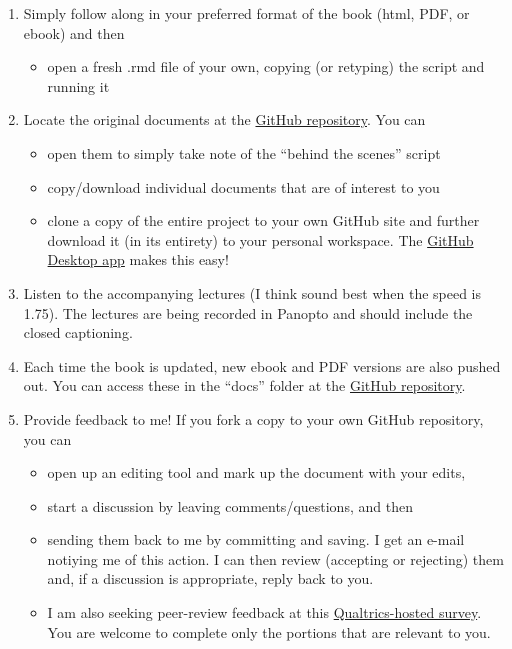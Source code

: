 \documentclass[
  11pt,
]{book}
\providecommand{\tightlist}{%
  \setlength{\itemsep}{0pt}\setlength{\parskip}{0pt}}
\begin{document}
\begin{enumerate}
\def\labelenumi{\arabic{enumi}.}
\item
  Simply follow along in your preferred format of the book (html, PDF, or ebook) and then

  \begin{itemize}
  \tightlist
  \item
    open a fresh .rmd file of your own, copying (or retyping) the script and running it
  \end{itemize}
\item
  Locate the original documents at the \href{https://github.com/lhbikos/ReCenterPsychStats}{GitHub repository}. You can

  \begin{itemize}
  \tightlist
  \item
    open them to simply take note of the ``behind the scenes'' script
  \item
    copy/download individual documents that are of interest to you
  \item
    clone a copy of the entire project to your own GitHub site and further download it (in its entirety) to your personal workspace. The \href{https://desktop.github.com/}{GitHub Desktop app} makes this easy!
  \end{itemize}
\item
  Listen to the accompanying lectures (I think sound best when the speed is 1.75). The lectures are being recorded in Panopto and should include the closed captioning.
\item
  Each time the book is updated, new ebook and PDF versions are also pushed out. You can access these in the ``docs'' folder at the \href{https://github.com/lhbikos/ReCenterPsychStats}{GitHub repository}.
\item
  Provide feedback to me! If you fork a copy to your own GitHub repository, you can

  \begin{itemize}
  \tightlist
  \item
    open up an editing tool and mark up the document with your edits,
  \item
    start a discussion by leaving comments/questions, and then
  \item
    sending them back to me by committing and saving. I get an e-mail notiying me of this action. I can then review (accepting or rejecting) them and, if a discussion is appropriate, reply back to you.
  \item
    I am also seeking peer-review feedback at this \href{https://spupsych.az1.qualtrics.com/jfe/form/SV_0OnBLfut3VIOIS2}{Qualtrics-hosted survey}. You are welcome to complete only the portions that are relevant to you.
  \end{itemize}
\end{enumerate}
\end{document}
